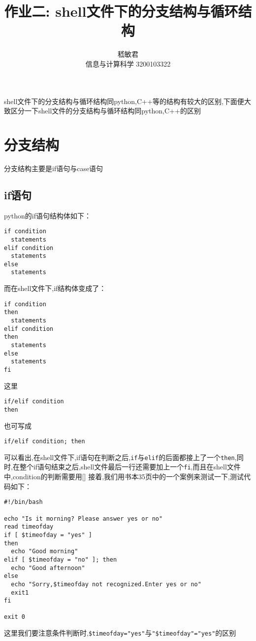 \documentclass{ctexart}
\title{作业二: shell文件下的分支结构与循环结构}
\author{嵇敏君 \\信息与计算科学 3200103322 }
\begin{document}
\maketitle

shell文件下的分支结构与循环结构同python,C++等的结构有较大的区别,下面便大致区分一下shell文件的分支结构与循环结构同python,C++的区别
\section{分支结构}
分支结构主要是if语句与case语句
\subsection{if语句}
python的if语句结构体如下：
\begin{verbatim}
if condition
  statements
elif condition
  statements
else
  statements
\end{verbatim}
而在shell文件下,if结构体变成了：
\begin{verbatim}
if condition
then
  statements
elif condition
then
  statements
else
  statements
fi
\end{verbatim}
这里
\begin{verbatim}
if/elif condition
then
\end{verbatim}
也可写成
\begin{verbatim}
if/elif condition; then
\end{verbatim}
可以看出,在shell文件下,if语句在判断之后,\verb|if|与\verb|elif|的后面都接上了一个\verb|then|,同时,在整个if语句结束之后,shell文件最后一行还需要加上一个\verb|fi|,而且在shell文件中,condition的判断需要用[]
接着,我们用书本35页中的一个案例来测试一下,测试代码如下：
\begin{verbatim}
#!/bin/bash

echo "Is it morning? Please answer yes or no"
read timeofday
if [ $timeofday = "yes" ]
then
  echo "Good morning"
elif [ $timeofday = "no" ]; then
  echo "Good afternoon"
else
  echo "Sorry,$timeofday not recognized.Enter yes or no"
  exit1
fi

exit 0
\end{verbatim}
这里我们要注意条件判断时,\verb|$timeofday="yes"|与\verb|"$timeofday"="yes"|的区别
\end{document}
